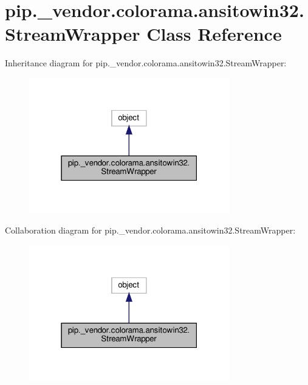 \hypertarget{classpip_1_1__vendor_1_1colorama_1_1ansitowin32_1_1StreamWrapper}{}\section{pip.\+\_\+vendor.\+colorama.\+ansitowin32.\+Stream\+Wrapper Class Reference}
\label{classpip_1_1__vendor_1_1colorama_1_1ansitowin32_1_1StreamWrapper}


Inheritance diagram for pip.\+\_\+vendor.\+colorama.\+ansitowin32.\+Stream\+Wrapper\+:
\nopagebreak
\begin{figure}[H]
\begin{center}
\leavevmode
\includegraphics[width=247pt]{classpip_1_1__vendor_1_1colorama_1_1ansitowin32_1_1StreamWrapper__inherit__graph}
\end{center}
\end{figure}


Collaboration diagram for pip.\+\_\+vendor.\+colorama.\+ansitowin32.\+Stream\+Wrapper\+:
\nopagebreak
\begin{figure}[H]
\begin{center}
\leavevmode
\includegraphics[width=247pt]{classpip_1_1__vendor_1_1colorama_1_1ansitowin32_1_1StreamWrapper__coll__graph}
\end{center}
\end{figure}
